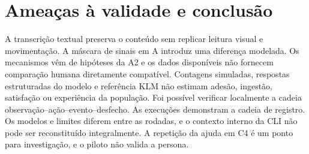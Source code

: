 \documentclass[conference,a4paper]{IEEEtran}
\begin{document}
\section{Ameaças à validade e conclusão}
A transcrição textual preserva o conteúdo sem replicar leitura visual e movimentação. A máscara de sinais em A introduz uma diferença modelada. Os mecanismos vêm de hipóteses da A2 e os dados disponíveis não fornecem comparação humana diretamente compatível. Contagens simuladas, respostas estruturadas do modelo e referência KLM não estimam adesão, ingestão, satisfação ou experiência da população. Foi possível verificar localmente a cadeia observação--ação--evento--desfecho. As execuções demonstram a cadeia de registro. Os modelos e limites diferem entre as rodadas, e o contexto interno da CLI não pode ser reconstituído integralmente. A repetição da ajuda em C4 é um ponto para investigação, e o piloto não valida a persona.



\end{document}
